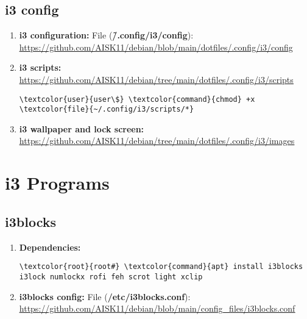 \documentclass[10pt, a4paper, onecolumn, openany]{book} %
\begin{document}
\section{i3 config}
\begin{enumerate}
    \item \textbf{i3 configuration:}
\newline File (\textbf{\textcolor{file}{\~/.config/i3/config}}):
\newline \underline{\url{https://github.com/AISK11/debian/blob/main/dotfiles/.config/i3/config}}
    \item \textbf{i3 scripts:}
\newline \underline{\url{https://github.com/AISK11/debian/tree/main/dotfiles/.config/i3/scripts}}
\begin{Verbatim}[commandchars=\\\{\}]
\textcolor{user}{user\$} \textcolor{command}{chmod} +x \textcolor{file}{~/.config/i3/scripts/*}
\end{Verbatim}
    \item \textbf{i3 wallpaper and lock screen:}
\newline \underline{\url{https://github.com/AISK11/debian/tree/main/dotfiles/.config/i3/images}}
\end{enumerate}
\chapter{i3 Programs}
\section{i3blocks}
\begin{enumerate}
    \item \textbf{Dependencies:}
\begin{Verbatim}[commandchars=\\\{\}]
\textcolor{root}{root#} \textcolor{command}{apt} install i3blocks i3lock numlockx rofi feh scrot light xclip
\end{Verbatim}
    \item \textbf{i3blocks config:}
\newline File (\textbf{\textcolor{file}{/etc/i3blocks.conf}}):
\newline \underline{\url{https://github.com/AISK11/debian/blob/main/config_files/i3blocks.conf}}
\end{enumerate}
\end{document}

